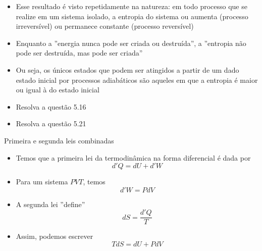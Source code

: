\begin{frame}
    \begin{itemize}
        \item Esse resultado é visto repetidamente na natureza: em todo processo
            que se realize em um sistema isolado, a entropia do sistema ou aumenta 
            (processo irreversível) ou permanece constante (processo reversível)
        \item Enquanto a ''energia nunca pode ser criada ou destruída'', a ''entropia não
            pode ser destruída, mas pode ser criada''
        \item Ou seja, os únicos estados que podem ser atingidos a partir de um dado
            estado inicial por processos adiabáticos são aqueles em que a entropia é
            maior ou igual à do estado inicial
        \item Resolva a questão 5.16
        \item Resolva a questão 5.21
    \end{itemize}
\end{frame}

\begin{frame}{Primeira e segunda leis combinadas}
    \begin{itemize}
        \item Temos que a primeira lei da termodinâmica na forma diferencial é dada por
            \[
                d'Q=dU+d'W
            \]
        \item Para um sistema \(PVT\), temos
            \[
                d'W=PdV
            \]
        \item A segunda lei ''define''
            \[
                dS = \frac{d'Q}{T}
            \]
        \item Assim, podemos escrever
            \[
                TdS=dU + PdV
            \]

    \end{itemize}
\end{frame}

